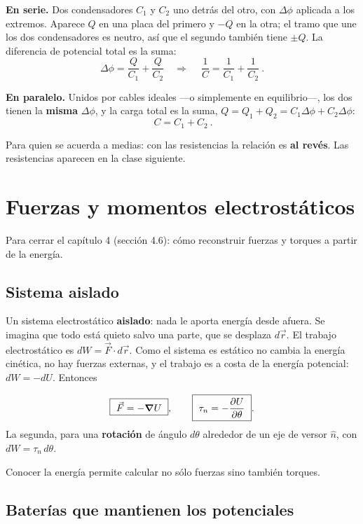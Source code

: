 \documentclass[12pt,a4paper]{article}
\begin{document}
\textbf{En serie.} Dos condensadores $C_1$ y $C_2$ uno detrás del otro, con
$\Delta\phi$ aplicada a los extremos. Aparece $Q$ en una placa del primero y $-Q$
en la otra; el tramo que une los dos condensadores es neutro, así que el segundo
también tiene $\pm Q$. La diferencia de potencial total es la suma:
\[
\Delta\phi = \frac{Q}{C_1} + \frac{Q}{C_2}
\quad\Longrightarrow\quad
\boxed{\ \frac{1}{C} = \frac{1}{C_1} + \frac{1}{C_2}\ } .
\]

\textbf{En paralelo.} Unidos por cables ideales ---o simplemente en equilibrio---,
los dos tienen la \textbf{misma} $\Delta\phi$, y la carga total es la suma,
$Q = Q_1 + Q_2 = C_1\Delta\phi + C_2\Delta\phi$:
\[
\boxed{\ C = C_1 + C_2\ } .
\]

\begin{notebox}
Para quien se acuerda a medias: con las resistencias la relación es \textbf{al
revés}. Las resistencias aparecen en la clase siguiente.
\end{notebox}

\section{Fuerzas y momentos electrostáticos}

Para cerrar el capítulo 4 (sección 4.6): cómo reconstruir fuerzas y torques a
partir de la energía.

\subsection{Sistema aislado}

Un sistema electrostático \textbf{aislado}: nada le aporta energía desde afuera.
Se imagina que todo está quieto salvo una parte, que se desplaza $d\vec r$. El
trabajo electrostático es $dW = \vec F\cdot d\vec r$. Como el sistema es estático
no cambia la energía cinética, no hay fuerzas externas, y el trabajo es a costa de
la energía potencial: $dW = -dU$. Entonces

\begin{keybox}
\[
\boxed{\ \vec F = -\grad U\ },
\qquad
\boxed{\ \tau_n = -\pdv{U}{\theta}\ } .
\]
La segunda, para una \textbf{rotación} de ángulo $d\theta$ alrededor de un eje de
versor $\hat n$, con $dW = \tau_n\,d\theta$.
\end{keybox}

Conocer la energía permite calcular no sólo fuerzas sino también torques.

\subsection{Baterías que mantienen los potenciales}
\end{document}
